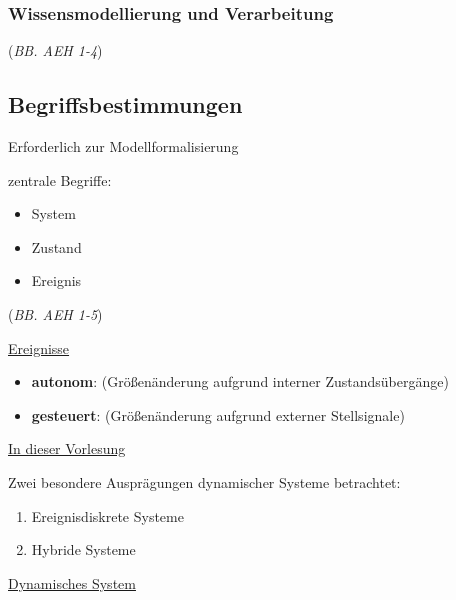 \subsubsection{Wissensmodellierung und Verarbeitung}
(\textit{BB. AEH 1-4})

\subsection{Begriffsbestimmungen}
Erforderlich zur Modellformalisierung

zentrale Begriffe:
\begin{itemize}
	\item System 
	\item Zustand
	\item Ereignis 
\end{itemize}

(\textit{BB. AEH 1-5})



\underline{Ereignisse}
\begin{itemize}
	\item \textbf{autonom}: (Größenänderung aufgrund interner Zustandsübergänge)
	\item \textbf{gesteuert}: (Größenänderung aufgrund externer Stellsignale)
\end{itemize}



\underline{In dieser Vorlesung}

Zwei besondere Ausprägungen dynamischer Systeme betrachtet:
\begin{enumerate}
	\item Ereignisdiskrete Systeme
	\item Hybride Systeme 
\end{enumerate}

\underline{Dynamisches System}

\begin{figure}[H]
	\centering
\end{figure}

